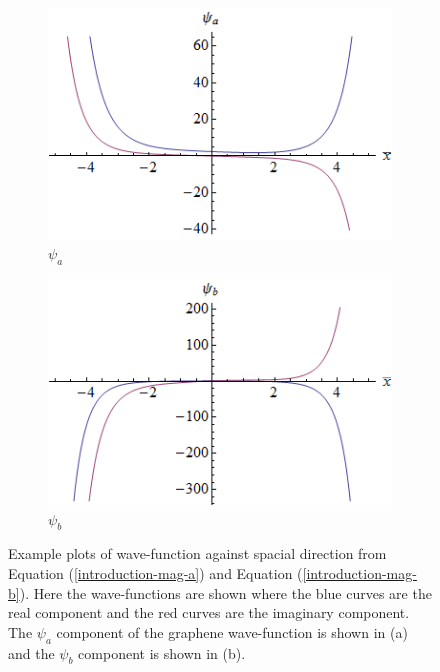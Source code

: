 \begin{figure}
	\begin{subfigure}{0.45\textwidth}
		\centerline{\includegraphics[scale=0.6]{images/magnetic-psi-a}}
		\caption{$\psi_{a}$}
		\label{}
	\end{subfigure}
	\hspace{1.2cm}
	\begin{subfigure}{0.45\textwidth}
		\centerline{\includegraphics[scale=0.6]{images/magnetic-psi-b}}
		\caption{$\psi_{b}$}
		\label{Magenetic Field wave-functions}
	\end{subfigure}
	\caption{Example plots of wave-function against spacial direction from Equation (\ref{introduction-mag-a}) and Equation (\ref{introduction-mag-b}). Here the wave-functions are shown where the blue curves are the real component and the red curves are the imaginary component. The $\psi_{a}$ component of the graphene wave-function is shown in (a) and the $\psi_{b}$ component is shown in (b).}
	\label{magnetic-psi-a}
\end{figure}
